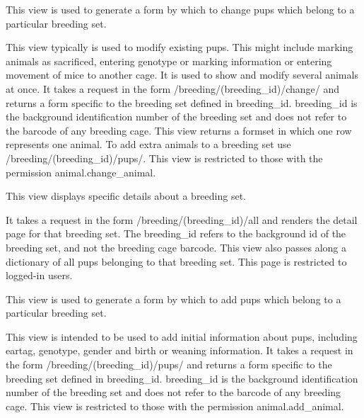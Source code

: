 \documentclass[letterpaper,10pt,english]{sphinxmanual}
\begin{document}
\begin{fulllineitems}
\label{api:animal.views.breeding_change}
This view is used to generate a form by which to change pups which belong to a particular breeding set.

This view typically is used to modify existing pups.  This might include marking animals as sacrificed, entering genotype or marking information or entering movement of mice to another cage.  It is used to show and modify several animals at once.
It takes a request in the form /breeding/(breeding\_id)/change/ and returns a form specific to the breeding set defined in breeding\_id.  breeding\_id is the background identification number of the breeding set and does not refer to the barcode of any breeding cage.
This view returns a formset in which one row represents one animal.  To add extra animals to a breeding set use /breeding/(breeding\_id)/pups/.
This view is restricted to those with the permission animal.change\_animal.

\end{fulllineitems}


\begin{fulllineitems}
\label{api:animal.views.breeding_detail}
This view displays specific details about a breeding set.

It takes a request in the form /breeding/(breeding\_id)/all and renders the detail page for that breeding set.
The breeding\_id refers to the background id of the breeding set, and not the breeding cage barcode.
This view also passes along a dictionary of all pups belonging to that breeding set.
This page is restricted to logged-in users.

\end{fulllineitems}


\begin{fulllineitems}
\label{api:animal.views.breeding_pups}
This view is used to generate a form by which to add pups which belong to a particular breeding set.

This view is intended to be used to add initial information about pups, including eartag, genotype, gender and birth or weaning information.
It takes a request in the form /breeding/(breeding\_id)/pups/ and returns a form specific to the breeding set defined in breeding\_id.  breeding\_id is the background identification number of the breeding set and does not refer to the barcode of any breeding cage.
This view is restricted to those with the permission animal.add\_animal.

\end{fulllineitems}
\end{document}
